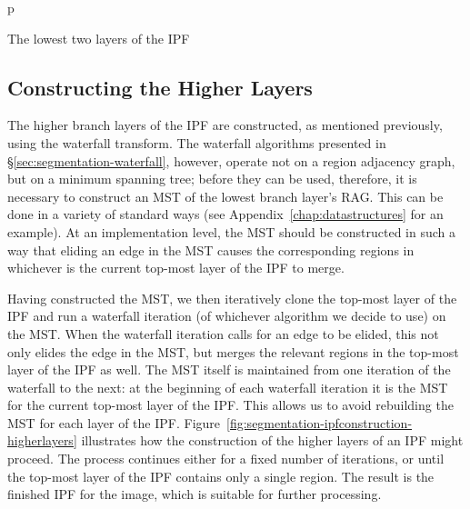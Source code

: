\begin{stusubfig}{p}
	\hspace{12mm}%
\caption{The lowest two layers of the IPF}
\label{fig:segmentation-ipfconstruction-lowestbranchlayer}
\end{stusubfig}

\subsection{Constructing the Higher Layers}

The higher branch layers of the IPF are constructed, as mentioned previously, using the waterfall transform. The waterfall algorithms presented in \S\ref{sec:segmentation-waterfall}, however, operate not on a region adjacency graph, but on a minimum spanning tree; before they can be used, therefore, it is necessary to construct an MST of the lowest branch layer's RAG. This can be done in a variety of standard ways (see Appendix~\ref{chap:datastructures} for an example). At an implementation level, the MST should be constructed in such a way that eliding an edge in the MST causes the corresponding regions in whichever is the current top-most layer of the IPF to merge.

Having constructed the MST, we then iteratively clone the top-most layer of the IPF and run a waterfall iteration (of whichever algorithm we decide to use) on the MST. When the waterfall iteration calls for an edge to be elided, this not only elides the edge in the MST, but merges the relevant regions in the top-most layer of the IPF as well. The MST itself is maintained from one iteration of the waterfall to the next: at the beginning of each waterfall iteration it is the MST for the current top-most layer of the IPF. This allows us to avoid rebuilding the MST for each layer of the IPF. Figure~\ref{fig:segmentation-ipfconstruction-higherlayers} illustrates how the construction of the higher layers of an IPF might proceed. The process continues either for a fixed number of iterations, or until the top-most layer of the IPF contains only a single region. The result is the finished IPF for the image, which is suitable for further processing.

